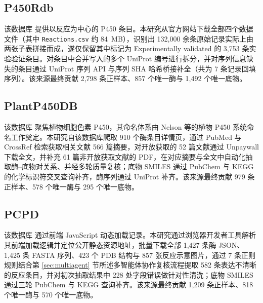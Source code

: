 \subsection{P450Rdb}
\label{subsec:src-p450rdb}

该数据库\cite{P450Rdb2024} 提供以反应为中心的 P450 条目。本研究从官方网站下载全部四个数据文件（其中 \texttt{Reactions.csv} 约 84~MB），识别出 132{,}000 余条原始记录实际上由两张子表拼接而成，遂仅保留其中标记为 Experimentally validated 的 3{,}753 条实验验证条目。对条目中合并写入的多个 UniProt 编号进行拆分，并对序列信息缺失的条目通过 UniProt\cite{UniProt2025} 序列 API 与序列 SHA 哈希桥接补全（共为 7 条记录回填序列）。该来源最终贡献 2{,}798 条正样本、857 个唯一酶与 1{,}492 个唯一底物。

\subsection{PlantP450DB}
\label{subsec:src-plantp450db}

该数据库\cite{Nelson2004} 聚焦植物细胞色素 P450，其命名体系由 Nelson 等的植物 P450 系统命名工作奠定。本研究自该数据库爬取 910 个酶条目详情页，通过 PubMed 与 CrossRef 检索获取相关文献 566 篇摘要，对开放获取的 52 篇文献通过 Unpaywall 下载全文，并补充 61 篇非开放获取文献的 PDF，在对应摘要与全文中自动化抽取酶--底物对关系、并经多轮质量复核；底物 SMILES 通过 PubChem\cite{PubChem2025} 与 KEGG\cite{KEGG2025} 的化学标识符交叉查询补齐，酶序列通过 UniProt 补齐。该来源最终贡献 979 条正样本、578 个唯一酶与 295 个唯一底物。

\subsection{PCPD}
\label{subsec:src-pcpd}

该数据库\cite{Wang2021PCPD} 通过前端 JavaScript 动态加载记录。本研究通过浏览器开发者工具解析其前端加载逻辑并定位公开静态资源地址，批量下载全部 1{,}427 条酶 JSON、1{,}425 条 FASTA 序列、423 个 PDB 结构与 857 张反应示意图片，通过 7 条正则规则结合第 \ref{sec:multiagent} 节所述多智能体协作复核流程提取 582 条表达不清晰的反应条目，并对初次抽取结果中 228 处字段错误做针对性清洗；底物 SMILES 通过三轮 PubChem 与 KEGG 查询补齐。该来源最终贡献 1{,}209 条正样本、818 个唯一酶与 570 个唯一底物。

